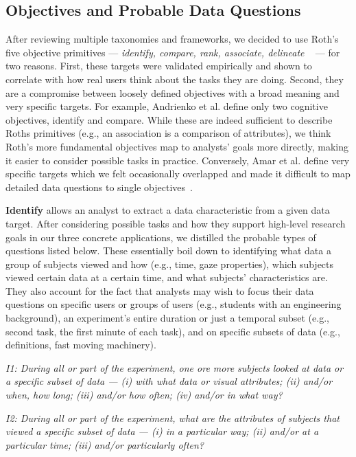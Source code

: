 \subsection{Objectives and Probable Data Questions}
After reviewing multiple taxonomies and frameworks, we decided to use Roth's five objective primitives --- \textit{identify, compare, rank, associate, delineate} ~\cite{Roth13}  --- for two reasons. First, these targets were validated empirically and shown to correlate with how real users think about the tasks they are doing. Second, they are a compromise between loosely defined objectives with a broad meaning and very specific targets. For example, Andrienko et al. define only two cognitive objectives, identify and compare. While these are indeed sufficient to describe Roths primitives (e.g., an association is a comparison of attributes), we think Roth's more fundamental objectives map to analysts' goals more directly, making it easier to consider possible tasks in practice. Conversely, Amar et al. define very specific targets which we felt occasionally overlapped and made it difficult to map detailed data questions to single objectives~\cite{Ama05}. 

\vspace{2mm}

\noindent\textbf{Identify} allows an analyst to extract a data characteristic from a given data target. After considering possible tasks and how they support high-level research goals in our three concrete applications, we distilled the probable types of questions listed below. These essentially boil down to identifying what data a group of subjects viewed and how (e.g., time, gaze properties), which subjects viewed certain data at a certain time, and what subjects' characteristics are. They also account for the fact that analysts may wish to focus their data questions on specific users or groups of users (e.g., students with an engineering background), an experiment's entire duration or just a temporal subset (e.g., second task, the first minute of each task), and on specific subsets of data (e.g., definitions, fast moving machinery). 

\vspace{2mm}
\hangindent=3mm\textit{I1: During all or part of the experiment, one ore more subjects looked at data or a specific subset of data --- (i) with what data or visual attributes; (ii) and/or when, how long; (iii) and/or how often; (iv) and/or in what way?}

\vspace{2mm}
\hangindent=3mm\textit{I2: During all or part of the experiment, what are the attributes of subjects that viewed a specific subset of data --- (i) in a particular way; (ii) and/or at a particular time; (iii) and/or particularly often?} 

